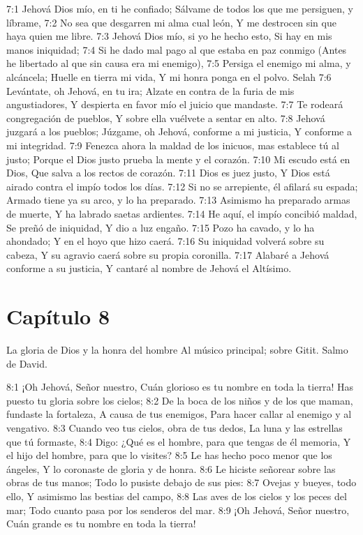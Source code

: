 7:1 Jehová Dios mío, en ti he confiado; 
Sálvame de todos los que me persiguen, y líbrame, 
7:2 No sea que desgarren mi alma cual león, 
Y me destrocen sin que haya quien me libre. 
7:3 Jehová Dios mío, si yo he hecho esto, 
Si hay en mis manos iniquidad; 
7:4 Si he dado mal pago al que estaba en paz conmigo 
(Antes he libertado al que sin causa era mi enemigo), 
7:5 Persiga el enemigo mi alma, y alcáncela; 
Huelle en tierra mi vida, 
Y mi honra ponga en el polvo. Selah 
7:6 Levántate, oh Jehová, en tu ira; 
Alzate en contra de la furia de mis angustiadores, 
Y despierta en favor mío el juicio que mandaste. 
7:7 Te rodeará congregación de pueblos, 
Y sobre ella vuélvete a sentar en alto. 
7:8 Jehová juzgará a los pueblos; 
Júzgame, oh Jehová, conforme a mi justicia, 
Y conforme a mi integridad. 
7:9 Fenezca ahora la maldad de los inicuos, mas establece tú al justo; 
Porque el Dios justo prueba la mente y el corazón. 
7:10 Mi escudo está en Dios, 
Que salva a los rectos de corazón. 
7:11 Dios es juez justo, 
Y Dios está airado contra el impío todos los días. 
7:12 Si no se arrepiente, él afilará su espada; 
Armado tiene ya su arco, y lo ha preparado. 
7:13 Asimismo ha preparado armas de muerte, 
Y ha labrado saetas ardientes. 
7:14 He aquí, el impío concibió maldad, 
Se preñó de iniquidad, 
Y dio a luz engaño. 
7:15 Pozo ha cavado, y lo ha ahondado; 
Y en el hoyo que hizo caerá. 
7:16 Su iniquidad volverá sobre su cabeza, 
Y su agravio caerá sobre su propia coronilla. 
7:17 Alabaré a Jehová conforme a su justicia, 
Y cantaré al nombre de Jehová el Altísimo. 
\section*{Capítulo 8}
La gloria de Dios y la honra del hombre 
Al músico principal; sobre Gitit. Salmo de David. 

8:1 ¡Oh Jehová, Señor nuestro, 
Cuán glorioso es tu nombre en toda la tierra! 
Has puesto tu gloria sobre los cielos; 
8:2 De la boca de los niños y de los que maman, fundaste la fortaleza, 
A causa de tus enemigos, 
Para hacer callar al enemigo y al vengativo. 
8:3 Cuando veo tus cielos, obra de tus dedos, 
La luna y las estrellas que tú formaste, 
8:4 Digo: ¿Qué es el hombre, para que tengas de él memoria, 
Y el hijo del hombre, para que lo visites? 
8:5 Le has hecho poco menor que los ángeles, 
Y lo coronaste de gloria y de honra. 
8:6 Le hiciste señorear sobre las obras de tus manos; 
Todo lo pusiste debajo de sus pies: 
8:7 Ovejas y bueyes, todo ello, 
Y asimismo las bestias del campo, 
8:8 Las aves de los cielos y los peces del mar; 
Todo cuanto pasa por los senderos del mar. 
8:9 ¡Oh Jehová, Señor nuestro, 
Cuán grande es tu nombre en toda la tierra! 
